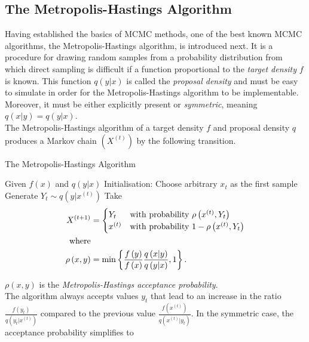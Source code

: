 \documentclass[12pt]{book}
\begin{document}
\subsection{The Metropolis-Hastings Algorithm}
Having established the basics of MCMC methods, one of the best known MCMC algorithms, the Metropolis-Hastings algorithm, is introduced next. It is a procedure for drawing random samples from a probability distribution from which direct sampling is difficult if a function proportional to the \textit{target density} $f$ is known. This function $q\left(y|x\right)$ is called the \textit{proposal density} and must be easy to simulate in order for the Metropolis-Hastings algorithm to be implementable. Moreover, it must be either explicitly present or \textit{symmetric}, meaning $q\left(x|y\right)=q\left(y|x\right)$. \\
The Metropolis-Hastings algorithm of a target density $f$ and proposal density $q$ produces a Markov chain $\left(X^{(t)}\right)$ by the following transition.
\begin{algorithm}
\caption{The Metropolis-Hastings Algorithm}
\begin{algorithmic}[1]
\Statex Given $f\left(x\right)$ and $q\left(y|x\right)$
\State Initialisation: Choose arbitrary $x_t$ as the first sample
    \State Generate $Y_t\sim q\left(y|x^{(t)}\right)$
    \State Take 
    \begin{align}
        X^{(t+1)}&=\begin{cases}
        Y_t & \hbox{with probability } \rho\left(x^{(t)}, Y_t\right) \\
        x^{(t)} & \hbox{with probability } 1-\rho\left(x^{(t)}, Y_t\right)
        \end{cases} \nonumber \\
    \hbox{where} \nonumber\\
    \rho\left(x,y\right) &= \min\left\lbrace\frac{f\left(y\right)}{f\left(x\right)}\frac{q\left(x|y\right)}{q\left(y|x\right)}, 1\right\rbrace.
    \end{align} 
    \EndFor
\end{algorithmic}
\end{algorithm} 
$\rho\left(x,y\right)$ is the \textit{Metropolis-Hastings acceptance probability}. \\
The algorithm always accepts values $y_t$ that lead to an increase in the ratio $\frac{f\left(y_t\right)}{q\left(y_t|x^{(t)}\right)}$ compared to the previous value $\frac{f\left(x^{(t)}\right)}{q\left(x^{(t)}|y_t\right)}$. In the symmetric case, the acceptance probability simplifies to
\end{document}

